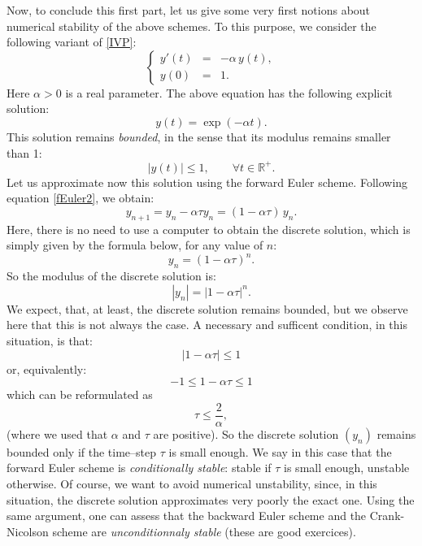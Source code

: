 \documentclass{article}
\begin{document}

Now, to conclude this first part, let us give some very first notions about numerical stability of the above schemes. To this purpose, we consider the following variant of \eqref{IVP}:
\begin{equation} \label{IVP_stability}
\left \{
\begin{array}{rcl}
y'(t) &=&  -\alpha \, y(t),\\
y(0) &=& 1.
\end{array}
\right .
\end{equation}
Here $\alpha > 0$ is a real parameter. %
The above equation has the following explicit solution:
\[
y(t) = \exp ( - \alpha t).
\]
This solution remains \emph{bounded}, in the sense that its modulus remains smaller than 1:
\[
|y(t)| \leq 1,\qquad \forall t\in\mathbb{R}^+.
\]
Let us approximate now this solution using the forward Euler scheme. Following equation \eqref{fEuler2}, we obtain:
\begin{equation} \label{fEulerStab}
        y_{n+1} = y_n - \alpha \tau y_n = (1 - \alpha \tau) \, y_n.
\end{equation}
Here, there is no need to use a computer to obtain the discrete solution, which is simply  given by the formula below, for any value of $n$:
\[
y_n = (1 - \alpha \tau)^n.
\]
So the modulus of the discrete solution is:
\[
|y_n| = |1 - \alpha \tau|^n.
\]
We expect, that, at least, the discrete solution remains bounded, but we observe here that this is not always the case. A necessary and sufficent condition, in this situation, is that:
\[
|1 - \alpha \tau | \leq 1
\]
or, equivalently:
\[
-1 \leq 1 - \alpha \tau  \leq 1
\]
which can be reformulated as
\[
\tau \leq \frac{2}{\alpha},
\]
(where we used that $\alpha$ and $\tau$ are positive). So the discrete solution $(y_n)$ remains bounded only if the time--step $\tau$ is small enough. We say in this case that the forward Euler scheme is \emph{conditionally stable}: stable if $\tau$ is small enough, unstable otherwise. Of course, we want to avoid numerical unstability, since, in this situation, the discrete solution approximates very poorly the exact one.
%
Using the same argument, one can assess that the backward Euler scheme and the Crank-Nicolson scheme are \emph{unconditionnaly stable} (these are good exercices).


\end{document}
